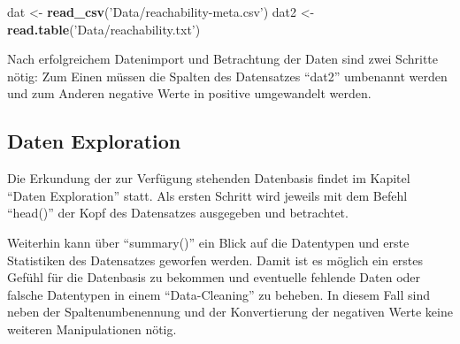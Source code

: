 \documentclass[]{article}
\newenvironment{Shaded}{\begin{snugshade}}{\end{snugshade}}
\newcommand{\DataTypeTok}[1]{\textcolor[rgb]{0.13,0.29,0.53}{#1}}
\newcommand{\DecValTok}[1]{\textcolor[rgb]{0.00,0.00,0.81}{#1}}
\newcommand{\KeywordTok}[1]{\textcolor[rgb]{0.13,0.29,0.53}{\textbf{#1}}}
\newcommand{\NormalTok}[1]{#1}
\newcommand{\OperatorTok}[1]{\textcolor[rgb]{0.81,0.36,0.00}{\textbf{#1}}}
\newcommand{\StringTok}[1]{\textcolor[rgb]{0.31,0.60,0.02}{#1}}
\begin{document}
\begin{Shaded}
\begin{Highlighting}[]
\NormalTok{dat <-}\StringTok{ }\KeywordTok{read_csv}\NormalTok{(}\StringTok{'Data/reachability-meta.csv'}\NormalTok{)}
\NormalTok{dat2 <-}\StringTok{ }\KeywordTok{read.table}\NormalTok{(}\StringTok{'Data/reachability.txt'}\NormalTok{)}
\end{Highlighting}
\end{Shaded}

Nach erfolgreichem Datenimport und Betrachtung der Daten sind zwei
Schritte nötig: Zum Einen müssen die Spalten des Datensatzes ``dat2''
umbenannt werden und zum Anderen negative Werte in positive umgewandelt
werden.

\begin{Shaded}
\end{Shaded}

\begin{Shaded}
\end{Shaded}

\hypertarget{daten-exploration}{%
\subsection{Daten Exploration}\label{daten-exploration}}

Die Erkundung der zur Verfügung stehenden Datenbasis findet im Kapitel
``Daten Exploration'' statt. Als ersten Schritt wird jeweils mit dem
Befehl ``head()'' der Kopf des Datensatzes ausgegeben und betrachtet.

Weiterhin kann über ``summary()'' ein Blick auf die Datentypen und erste
Statistiken des Datensatzes geworfen werden. Damit ist es möglich ein
erstes Gefühl für die Datenbasis zu bekommen und eventuelle fehlende
Daten oder falsche Datentypen in einem ``Data-Cleaning'' zu beheben. In
diesem Fall sind neben der Spaltenumbenennung und der Konvertierung der
negativen Werte keine weiteren Manipulationen nötig.
\end{document}
